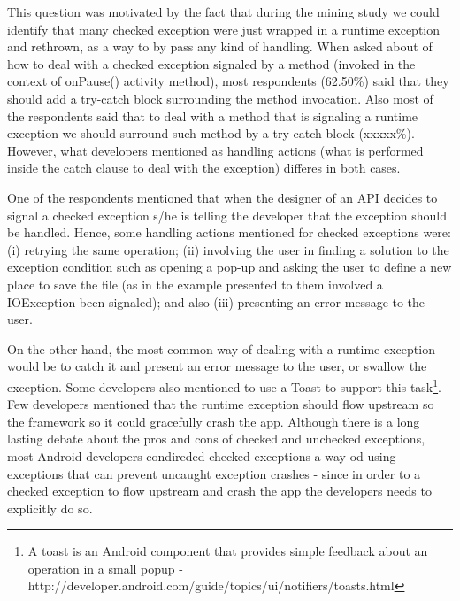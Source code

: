 This question was motivated by the fact that during the mining study we could identify that many checked exception were just wrapped in a runtime exception and rethrown, as a way to by pass any kind of handling. When asked about of how to deal with a checked exception signaled by a method (invoked in the context of onPause() activity method), most respondents (62.50\%) said that they should add a try-catch block surrounding the method invocation. Also most of the respondents said that to deal with a method that is signaling a runtime exception we should surround such method by a try-catch block (xxxxx\%). However, what developers mentioned as handling actions (what is performed inside the catch clause to deal with the exception) differes in both cases. 

One of the respondents mentioned that when the designer of an API decides to signal a checked exception s/he is telling the developer that the exception should be handled. Hence, some handling actions mentioned for checked exceptions were: (i) retrying the same operation; (ii) involving the user in finding a solution to the exception condition such as opening a pop-up and asking the user to define a new place to save the file (as in the example presented to them involved a IOException been signaled); and also (iii) presenting an error message to the user. 

On the other hand, the most common way of dealing with a runtime exception would be to catch it and present an error message to the user, or swallow the exception. Some developers also mentioned to use a Toast to support this task\footnote{A toast is an Android component that provides simple feedback about an operation in a small popup - http://developer.android.com/guide/topics/ui/notifiers/toasts.html}. Few developers mentioned that the runtime exception should flow upstream so the framework so it could gracefully crash the app. Although there is a long lasting debate about the pros and cons of checked and unchecked exceptions, most Android developers condireded checked exceptions a way od using exceptions that can prevent uncaught exception crashes - since in order to a checked exception to flow upstream and crash the app the developers needs to explicitly do so. 				

